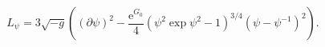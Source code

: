 \begin{equation}\label{psi}
    L_{\psi} = 3\sqrt{-g}((\partial \psi)^{2} - \frac{\mathrm{e}^{G_{0}}}{4}
    (\psi^{2}\exp{\psi^{2}-1})^{3/4}(\psi - \psi^{-1})^{2}).
\end{equation}

